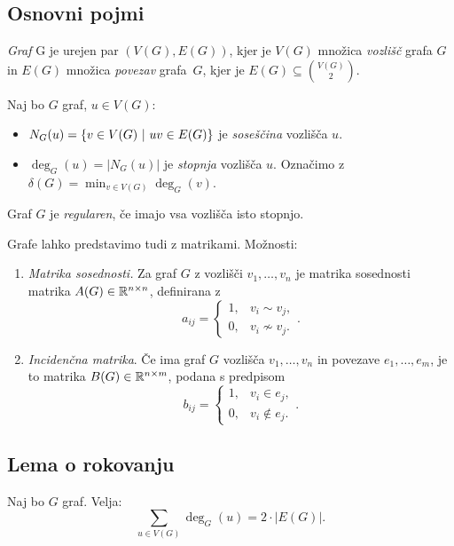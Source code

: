 \subsection{Osnovni pojmi}
\begin{definicija}
    \emph{Graf} G je urejen par $(V(G), E(G))$, kjer je $V(G)$ množica \emph{vozlišč} grafa $G$ in $E(G)$ množica \emph{povezav} grafa~$G$, kjer je $E(G) \subseteq \binom{V(G)}{2}$.
\end{definicija}

\begin{definicija}
    Naj bo $G$ graf, $u \in V(G)$:
    \begin{itemize}
        \item $N_G(u) = \left\{v \in V(G) \ | \ uv \in E(G)\right\}$ je \emph{soseščina} vozlišča $u$.
        \item $\deg_G(u) = |N_G(u)|$ je \emph{stopnja} vozlišča $u$. Označimo z $\delta(G) = \min_{v \in V(G)}\deg_G(v)$.
    \end{itemize}
\end{definicija}

\begin{definicija}
    Graf $G$ je \emph{regularen}, če imajo vsa vozlišča isto stopnjo.
\end{definicija}

\begin{primer}
    Grafe lahko predstavimo tudi z matrikami. Možnosti:
    \begin{enumerate}
        \item \emph{Matrika sosednosti.} Za graf $G$ z vozlišči $v_1, \ldots, v_n$ je matrika sosednosti matrika $A(G) \in \mathbb{R}^{n \times n}$, definirana z $$a_{ij} = \begin{cases}
            1, &v_i \sim v_j, \\
            0, &v_i \nsim v_j.
        \end{cases}.$$
        \item \emph{Incidenčna matrika}. Če ima graf $G$  vozlišča $v_1, \ldots, v_n$ in povezave $e_1, \ldots, e_m$, je to matrika $B(G) \in \mathbb{R}^{n \times m}$, podana s predpisom $$b_{ij} = \begin{cases}
            1, &v_i \in e_j, \\
            0, &v_i \notin e_j.
        \end{cases}.$$
    \end{enumerate}
\end{primer}

\subsection{Lema o rokovanju}
\begin{lema}
    Naj bo $G$ graf. Velja: $$\sum_{u \in V(G)} \deg_G(u) = 2 \cdot |E(G)|.$$
\end{lema}

